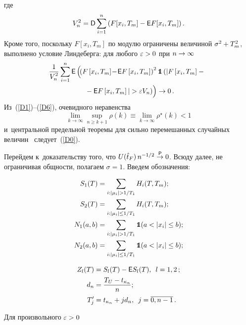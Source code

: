 \begin{multicols}{2}
где 
$$
V_n^2 = {\mathsf D} \sum\limits_{i=1}^n \left(F[x_i, T_m] \hm- {\mathsf E} F[x_i, T_m]\right).
$$
Кроме того, поскольку $F[x_i, T_m]$ по модулю ограничены величиной $\sigma^2 \hm+ 
T_m^2$, выполнено условие Линдеберга: для любого $\eps\hm>0$ при $n \hm\to \infty$
\begin{multline}
\label{D6}
\!\!\!\fr{1}{V_n^2}\sum\limits_{i=1}^n {\mathsf E} \left( \!\left( F\left[x_i, T_m\right]\! -\! {\mathsf E} F\left[x_i, T_m\right]\right)^2 
\Ik \left(\vert F\left[x_i, T_m\right] -{}\right.\right.\hspace*{-2.69505pt}\\
\left.\left.{}- {\mathsf E} F\left[x_i, T_m\right]\vert >\eps V_n\right)\!
\vphantom{\left( F\left[x_i, T_m\right]\! -\! {\mathsf E} F\left[x_i, T_m\right]\right)^2}
\right) 
\to  0\,.
\end{multline}
Из~(\ref{D1})--(\ref{D6}), очевидного неравенства
$$ 
\lim\limits_{k\to\infty} \sup\limits_{n\geq k+1}\rho(k) \equiv 
\lim\limits_{k\to\infty} \rho^\star (k)  < 1
$$
 и~центральной предельной теоремы для сильно перемешанных случайных величин~\cite{Peligrad} следует~(\ref{D0}).

Перейдем к~доказательству того, что $U(\hat{t}_F) \, n^{-1/2} \overset{\, {\sf P} \, }{\to} 0$.
Всюду далее, не ограничивая общности, полагаем $\sigma=1$. 
Введем обозначения:

\noindent
\begin{align*}
S_1(T) &= \sum\limits_{i: |\mu_i| > 1/T_1} H_i(T, T_m); \\
S_2(T) &= \sum\limits_{i: |\mu_i| \leq 1/T_1} H_i(T, T_m); 
\\
N_1(a, b) &= \sum\limits_{i: |\mu_i| > 1/T_1} \Ik (a<|x_i|\leq b); \\ 
N_2(a, b) &= \sum\limits_{i: |\mu_i| \leq 1/T_1} \Ik (a<|x_i|\leq b);
\end{align*}

\noindent
\begin{align*}
Z_l(T) &= S_l(T) - {\mathsf E} S_l(T),\enskip l = 1,2\,; \\  
d_n &= \displaystyle\frac{\displaystyle T_U -  t_{\kappa_n}\mathstrut}{\displaystyle n\mathstrut};\\
T_j^{\prime} &= t_{\kappa_n}+j d_n,\enskip j = \overline{0,n-1}\,.
\end{align*} 

\vspace*{-3pt}

\noindent
Для произвольного $\varepsilon>0$

\vspace*{-3pt}


\end{multicols}
